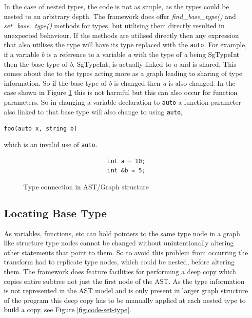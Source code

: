 \documentclass[bsc,frontabs,singlespacing,twoside,parskip,deptreport]{infthesis}
\begin{document}
In the case of nested types, the code is not as simple, as the types could be nested to an arbitrary depth. The framework does offer \textit{find\_base\_type()} and \textit{set\_base\_type()} methods for types, but utilising them directly resulted in unexpected behaviour. If the methods are utilised directly then any expression that also utilises the type will have its type replaced with the \texttt{auto}. For example, if a variable \textit{b} is a reference to a variable \textit{a} with the type of \textit{a} being SgTypeInt then the base type of \textit{b}, SgTypeInt, is actually linked to \textit{a} and is shared. This comes about due to the types acting more as a graph leading to sharing of type information. So if the base type of \textit{b} is changed then \textit{a} is also changed. In the case shown in Figure \ref{fig:type-con-bug} this is not harmful but this can also occur for function parameters. So in changing a variable declaration to \texttt{auto} a function parameter also linked to that base type will also change to using \texttt{auto},
\begin{center}
    \texttt{foo(auto x, string b)}
\end{center}
which is an invalid use of \texttt{auto}.

\begin{figure}[!h]
    \begin{verbatim}
                        int a = 10;
                        int &b = 5;  
    \end{verbatim}
    \caption{Type connection in AST/Graph structure}
    \centering
    \label{fig:type-con-bug}
\end{figure}

\subsection{Locating Base Type}\label{sec:auto-loc-base-type}

As variables, functions, etc can hold pointers to the same type node in a graph like structure type nodes cannot be changed without unintentionally altering other statements that point to them. So to avoid this problem from occurring the transform had to replicate type nodes, which could be nested, before altering them. The framework does feature facilities for performing a deep copy which copies entire subtree not just the first node of the AST. As the type information is not represented in the AST model and is only present in larger graph structure of the program this deep copy has to be manually applied at each nested type to build a copy, see Figure \ref{fig:code-set-type}. 
\end{document}
